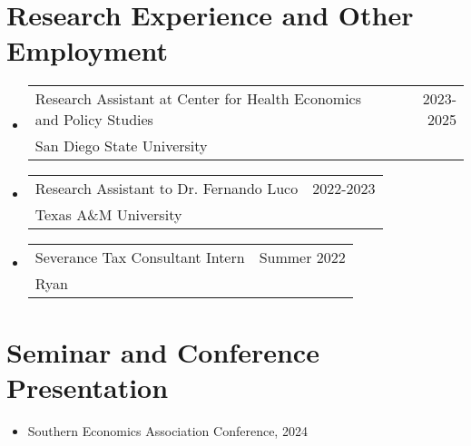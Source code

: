 \documentclass[letterpaper,11pt]{article}
\makeatletter
\newcommand{\resumeSubheading}[4]{
  \vspace{-2pt}
    \item
    \begin{tabular*}{0.97\textwidth}[t]{l@{\extracolsep{\fill}}r}
      #1 & #2 \\
      \hspace{0.15in}#3 & {#4} \\
    \end{tabular*}\vspace{-7pt}
}
\newcommand{\resumeSubHeadingListStart}{\begin{itemize}[leftmargin=0.15in, label={}]}
\newcommand{\resumeSubHeadingListEnd}{\end{itemize}}
\makeatother
\begin{document}
\section{Research Experience and Other Employment}
    \resumeSubHeadingListStart

      \resumeSubheading{Research Assistant at Center for 
      Health Economics and Policy Studies}{2023-2025}
      {San Diego State University}{}

      \resumeSubheading{Research Assistant to Dr. Fernando Luco}{2022-2023}
      {Texas A\&M University}{}

      \resumeSubheading{Severance Tax Consultant Intern}{Summer 2022}{Ryan}{}

    \resumeSubHeadingListEnd

\section{Seminar and Conference Presentation}

    \resumeSubHeadingListStart
    
    \item
    Southern Economics Association Conference, 2024
    
    \resumeSubHeadingListEnd

\end{document}
